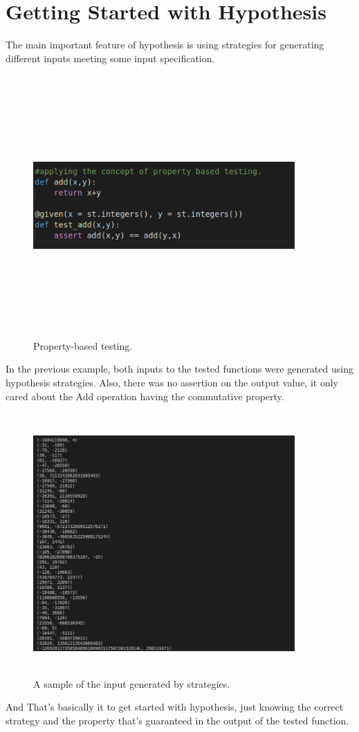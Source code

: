 \documentclass[]{article}
\begin{document}
\section{{\large Getting Started with Hypothesis}}
The main important feature of hypothesis is using strategies for generating different inputs meeting some input specification.
\begin{figure}[H]
	\includegraphics[width=10cm,height=10cm,keepaspectratio]{testing_0.png}
	\caption{Property-based testing.}
	\label{fig 1: Property-based testing.}
\end{figure}
In the previous example, both inputs to the tested functions were generated using hypothesis strategies. Also, there was no assertion on the output value, it only cared about the Add operation having the commutative property.
\begin{figure}[H]
	\includegraphics[width=10cm,height=10cm,keepaspectratio]{testing_1.png}
	\caption{A sample of the input generated by strategies.}
	\label{fig 2: strategies' input.}
\end{figure}
And That's basically it to get started with hypothesis, just knowing the correct strategy and the property that's guaranteed in the output of the tested function.
 
\end{document}
